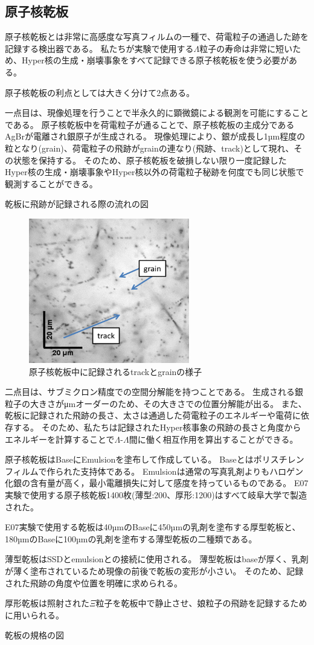 \documentclass[12pt,a4paper]{jarticle}
\begin{document}
\subsection{原子核乾板}
原子核乾板とは非常に高感度な写真フィルムの一種で、荷電粒子の通過した跡を記録する検出器である。
私たちが実験で使用する$\Lambda$粒子の寿命は非常に短いため、Hyper核の生成・崩壊事象をすべて記録できる原子核乾板を使う必要がある。
\par
原子核乾板の利点としては大きく分けて2点ある。
\par
一点目は、現像処理を行うことで半永久的に顕微鏡による観測を可能にすることである。
原子核乾板中を荷電粒子が通ることで、原子核乾板の主成分であるAgBrが電離され銀原子が生成される。
現像処理により、銀が成長し1µm程度の粒となり(grain)、荷電粒子の飛跡がgrainの連なり(飛跡、track)として現れ、その状態を保持する。
そのため、原子核乾板を破損しない限り一度記録したHyper核の生成・崩壊事象やHyper核以外の荷電粒子秘跡を何度でも同じ状態で観測することができる。
\par
乾板に飛跡が記録される際の流れの図
\par
\begin{figure}[htbp]
 \begin{center}
  \includegraphics[width=70mm]{grainfog.png}
 \end{center}
 \caption{原子核乾板中に記録されるtrackとgrainの様子}
\end{figure}
二点目は、サブミクロン精度での空間分解能を持つことである。
生成される銀粒子の大きさがμmオーダーのため、その大きさでの位置分解能が出る。
また、乾板に記録された飛跡の長さ、太さは通過した荷電粒子のエネルギーや電荷に依存する。
そのため、私たちは記録されたHyper核事象の飛跡の長さと角度からエネルギーを計算することで$\Lambda$-$\Lambda$間に働く相互作用を算出することができる。
\par
原子核乾板はBaseにEmulsionを塗布して作成している。
Baseとはポリスチレンフィルムで作られた支持体である。
Emulsionは通常の写真乳剤よりもハロゲン化銀の含有量が高く，最小電離損失に対して感度を持っているものである。
E07実験で使用する原子核乾板1400枚(薄型:200、厚形:1200)はすべて岐阜大学で製造された。
\par
E07実験で使用する乾板は40µmのBaseに450µmの乳剤を塗布する厚型乾板と、180µmのBaseに100µmの乳剤を塗布する薄型乾板の二種類である。
\par
薄型乾板はSSDとemulsionとの接続に使用される。
薄型乾板はbaseが厚く、乳剤が薄く塗布されているため現像の前後で乾板の変形が小さい。
そのため、記録された飛跡の角度や位置を明確に求められる。
\par
厚形乾板は照射された$\Xi$粒子を乾板中で静止させ、娘粒子の飛跡を記録するために用いられる。
\par
乾板の規格の図
\end{document}

